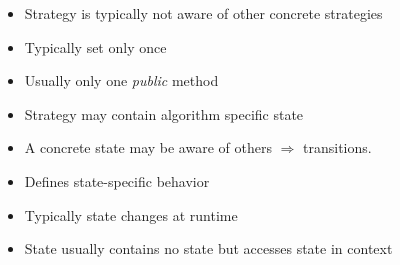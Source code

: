 \begin{sectionbox}\nospacing
\begin{minipage}[t]{0.45\textwidth}
  \begin{itemize}
    \item Strategy is typically not aware of other concrete strategies
    \item Typically set only once
    \item Usually only one \textit{public} method
    \item Strategy may contain algorithm specific state
  \end{itemize}
\end{minipage}
\begin{minipage}[t]{0.45\textwidth}
  \begin{itemize}
      \item A concrete state may be aware of others $\Rightarrow$ transitions.
      \item Defines state-specific behavior
      \item Typically state changes at runtime
      \item State usually contains no state but accesses state in context
  \end{itemize}
\end{minipage}
\end{sectionbox}
